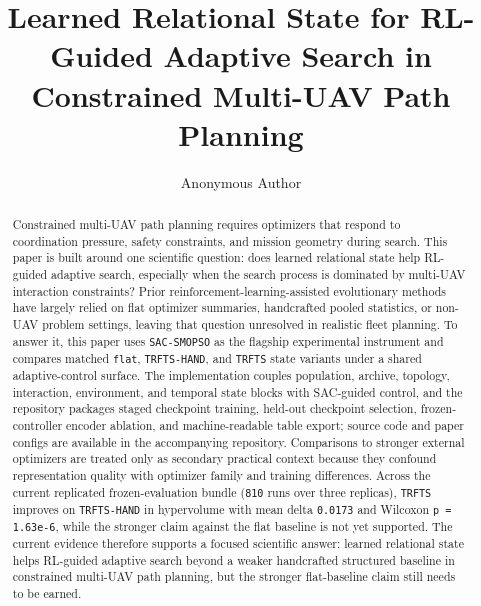 \documentclass[a4paper,fleqn]{cas-sc}
\begin{document}
\let\WriteBookmarks\relax
\def\floatpagepagefraction{1}
\def\textpagefraction{.001}


\title[mode=title]{Learned Relational State for RL-Guided Adaptive Search in Constrained Multi-UAV Path Planning}

\author[1]{Anonymous Author}


\begin{abstract}
Constrained multi-UAV path planning requires optimizers that respond to coordination pressure, safety constraints, and mission geometry during search. This paper is built around one scientific question: does learned relational state help RL-guided adaptive search, especially when the search process is dominated by multi-UAV interaction constraints? Prior reinforcement-learning-assisted evolutionary methods have largely relied on flat optimizer summaries, handcrafted pooled statistics, or non-UAV problem settings, leaving that question unresolved in realistic fleet planning. To answer it, this paper uses \texttt{SAC-SMOPSO} as the flagship experimental instrument and compares matched \texttt{flat}, \texttt{TRFTS-HAND}, and \texttt{TRFTS} state variants under a shared adaptive-control surface. The implementation couples population, archive, topology, interaction, environment, and temporal state blocks with SAC-guided control, and the repository packages staged checkpoint training, held-out checkpoint selection, frozen-controller encoder ablation, and machine-readable table export; source code and paper configs are available in the accompanying repository. Comparisons to stronger external optimizers are treated only as secondary practical context because they confound representation quality with optimizer family and training differences. Across the current replicated frozen-evaluation bundle (\texttt{810} runs over three replicas), \texttt{TRFTS} improves on \texttt{TRFTS-HAND} in hypervolume with mean delta \texttt{0.0173} and Wilcoxon \texttt{p = 1.63e-6}, while the stronger claim against the flat baseline is not yet supported. The current evidence therefore supports a focused scientific answer: learned relational state helps RL-guided adaptive search beyond a weaker handcrafted structured baseline in constrained multi-UAV path planning, but the stronger flat-baseline claim still needs to be earned.
\end{abstract}
\end{document}
